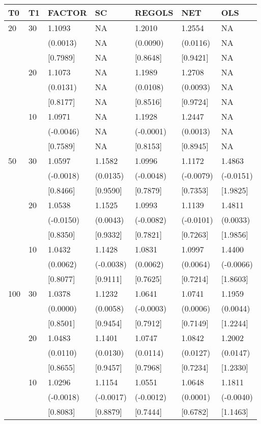 \begin{table}[ht]
\centering
\begin{tabular}{lllllll}
\hline
T0&T1&FACTOR&SC&REGOLS&NET&OLS\\
\hline
20&30&1.1093&NA&1.2010&1.2554&NA\\
&&(0.0013)&NA&(0.0090)&(0.0116)&NA\\
&&[0.7989]&NA&[0.8648]&[0.9421]&NA\\
&20&1.1073&NA&1.1989&1.2708&NA\\
&&(0.0131)&NA&(0.0108)&(0.0093)&NA\\
&&[0.8177]&NA&[0.8516]&[0.9724]&NA\\
&10&1.0971&NA&1.1928&1.2447&NA\\
&&(-0.0046)&NA&(-0.0001)&(0.0013)&NA\\
&&[0.7589]&NA&[0.8153]&[0.8945]&NA\\

50&30&1.0597&1.1582&1.0996&1.1172&1.4863\\
&&(-0.0018)&(0.0135)&(-0.0048)&(-0.0079)&(-0.0151)\\
&&[0.8466]&[0.9590]&[0.7879]&[0.7353]&[1.9825]\\
&20&1.0538&1.1525&1.0993&1.1139&1.4811\\
&&(-0.0150)&(0.0043)&(-0.0082)&(-0.0101)&(0.0033)\\
&&[0.8350]&[0.9332]&[0.7821]&[0.7263]&[1.9856]\\
&10&1.0432&1.1428&1.0831&1.0997&1.4400\\
&&(0.0062)&(-0.0038)&(0.0062)&(0.0064)&(-0.0066)\\
&&[0.8077]&[0.9111]&[0.7625]&[0.7214]&[1.8603]\\

100&30&1.0378&1.1232&1.0641&1.0741&1.1959\\
&&(0.0000)&(0.0058)&(-0.0003)&(0.0006)&(0.0044)\\
&&[0.8501]&[0.9454]&[0.7912]&[0.7149]&[1.2244]\\
&20&1.0483&1.1401&1.0747&1.0842&1.2002\\
&&(0.0110)&(0.0130)&(0.0114)&(0.0127)&(0.0147)\\
&&[0.8655]&[0.9457]&[0.7968]&[0.7234]&[1.2330]\\
&10&1.0296&1.1154&1.0551&1.0648&1.1811\\
&&(-0.0018)&(-0.0017)&(-0.0012)&(0.0001)&(-0.0040)\\
&&[0.8083]&[0.8879]&[0.7444]&[0.6782]&[1.1463]\\
\hline
\end{tabular}
\end{table}

